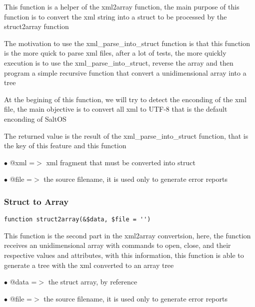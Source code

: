 \documentclass[a4paper]{article}
\begin{document}
This function is a helper of the xml2array function, the main purpose of this
function is to convert the xml string into a struct to be processed by the
struct2array function

The motivation to use the xml\_parse\_into\_struct function is that this function
is the more quick to parse xml files, after a lot of tests, the more quickly
execution is to use the xml\_parse\_into\_struct, reverse the array and then
program a simple recursive function that convert a unidimensional array into
a tree

At the begining of this function, we will try to detect the enconding of the
xml file, the main objective is to convert all xml to UTF-8 that is the default
enconding of SaltOS

The returned value is the result of the xml\_parse\_into\_struct function, that is
the key of this feature and this function

\begin{compactitem}
\item[\color{myblue}$\bullet$] @xml  =$>$ xml fragment that must be converted into struct
\item[\color{myblue}$\bullet$] @file =$>$ the source filename, it is used only to generate error reports
\end{compactitem}

\hypertarget{toc281}{}
\subsubsection{Struct to Array}

\begin{lstlisting}
function struct2array(&$data, $file = '')
\end{lstlisting}

This function is the second part in the xml2array convertsion, here, the function
receives an unidimensional array with commands to open, close, and their respective
values and attributes, with this information, this function is able to generate a
tree with the xml converted to an array tree

\begin{compactitem}
\item[\color{myblue}$\bullet$] @data =$>$ the struct array, by reference
\item[\color{myblue}$\bullet$] @file =$>$ the source filename, it is used only to generate error reports
\end{compactitem}
\end{document}
